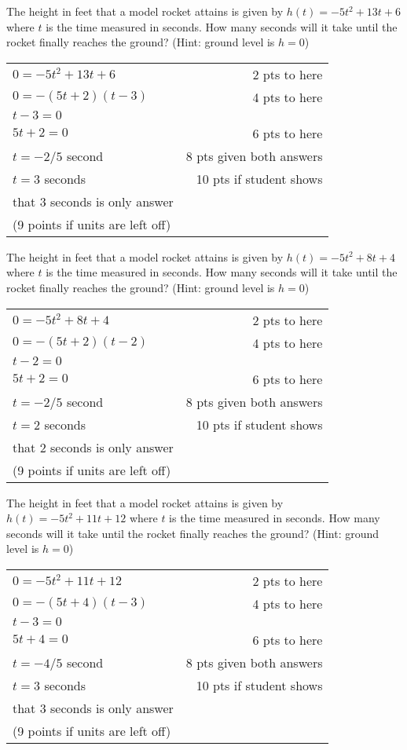 {
	The height in feet that a model rocket attains is given by $h(t)=-5t^2+13t+6$ where $t$  is the time measured in seconds. How many seconds will it take until the rocket finally reaches the ground? (Hint: ground level is $h=0$)
}
{
	\begin{tabular}{l r}
	$0=-5t^2+13t+6$ &		2 pts to here\\
	$0=-(5t+2)(t-3)$ &		4 pts to here\\
	$t-3=0$			\\
	$5t+2=0$			& 6 pts to here\\
	$t=-2/5$ second	&		8 pts given both answers\\
	$t=3$ seconds	&		10 pts if student shows\\
	that 3 seconds is only answer\\
	(9 points if units are left off)
	\end{tabular}
}

{
	The height in feet that a model rocket attains is given by $h(t)=-5t^2+8t+4$ where $t$  is the time measured in seconds. How many seconds will it take until the rocket finally reaches the ground? (Hint: ground level is $h=0$)
}
{
	\begin{tabular}{l r}
	$0=-5t^2+8t+4$ &		2 pts to here\\
	$0=-(5t+2)(t-2)$ &		4 pts to here\\
	$t-2=0$			\\
	$5t+2=0$			& 6 pts to here\\
	$t=-2/5$ second	&		8 pts given both answers\\
	$t=2$ seconds	&		10 pts if student shows\\
	that 2 seconds is only answer\\
	(9 points if units are left off)
	\end{tabular}
}

{
	The height in feet that a model rocket attains is given by $h(t)=-5t^2+11t+12$ where $t$  is the time measured in seconds. How many seconds will it take until the rocket finally reaches the ground? (Hint: ground level is $h=0$)
}
{
	\begin{tabular}{l r}
	$0=-5t^2+11t+12$ &		2 pts to here\\
	$0=-(5t+4)(t-3)$ &		4 pts to here\\
	$t-3=0$			\\
	$5t+4=0$			& 6 pts to here\\
	$t=-4/5$ second	&		8 pts given both answers\\
	$t=3$ seconds	&		10 pts if student shows\\
	that 3 seconds is only answer\\
	(9 points if units are left off)
	\end{tabular}
}

